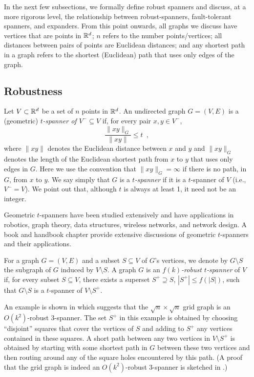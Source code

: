 \documentclass{patmorin}
\begin{document}
In the next few subsections, we formally define robust spanners
and discuss, at a more rigorous level, the relationship between
robust-spanners, fault-tolerant spanners, and expanders.  From this point
onwards, all graphs we discuss have vertices that are points in $\mathbb{R}^d$;
$n$ refers to the number points/vertices;  all distances between pairs of
points are Euclidean distances; and any shortest path in a graph refers
to the shortest (Euclidean) path that uses only edges of the graph.

\subsection{Robustness}

Let $V\subset \mathbb{R}^d$ be a set of $n$ points in $\mathbb{R}^d$.  An undirected
graph $G=(V,E)$ is a (geometric) \emph{$t$-spanner of $V^-\subseteq V$}
if, for every pair $x,y\in V^-$,
\[
  \frac{\|xy\|_G}{\|xy\|} \le t \enspace ,
\]
where $\|xy\|$ denotes the Euclidean distance between $x$ and $y$ and
$\|xy\|_G$ denotes the length of the Euclidean shortest path from $x$
to $y$ that uses only edges in $G$.  Here we use the convention that
$\|xy\|_G=\infty$ if there is no path, in $G$, from $x$ to $y$.  We say
simply that $G$ is a \emph{$t$-spanner} if it is a $t$-spanner of $V$
(i.e., $V^-=V$).  We point out that, although $t$ is always at least 1,
it need not be an integer.

Geometric $t$-spanners have been studied extensively and have applications
in robotics, graph theory, data structures, wireless networks, and network
design.  A book \cite{ns07} and handbook chapter \cite{e99} provide
extensive discussions of geometric $t$-spanners and their applications.

For a graph $G=(V,E)$ and a subset $S\subseteq V$ of $G$'s vertices, we
denote by $G\setminus S$ the subgraph of $G$ induced by $V\setminus S$.
A graph $G$ is an \emph{$f(k)$-robust $t$-spanner} of $V$ if, for every
subset $S\subseteq V$, there exists a superset $S^+\supseteq S$, $|S^+|\le
f(|S|)$, such that $G\setminus S$ is a $t$-spanner of $V\setminus S^+$.

An example is shown in  which suggests that the
$\sqrt{n}\times\sqrt{n}$ grid graph is an $O(k^2)$-robust 3-spanner.
The set $S^+$ in this example is obtained by choosing ``disjoint''
squares that cover the vertices of $S$ and adding to $S^+$ any vertices
contained in these squares.  A short path between any two vertices in
$V\setminus S^+$ is obtained by starting with some shortest path in $G$
between these two vertices and then routing around any of the square
holes encountered by this path. (A proof that the grid graph is indeed
an $O(k^2)$-robust 3-spanner is sketched in .)
\end{document}
